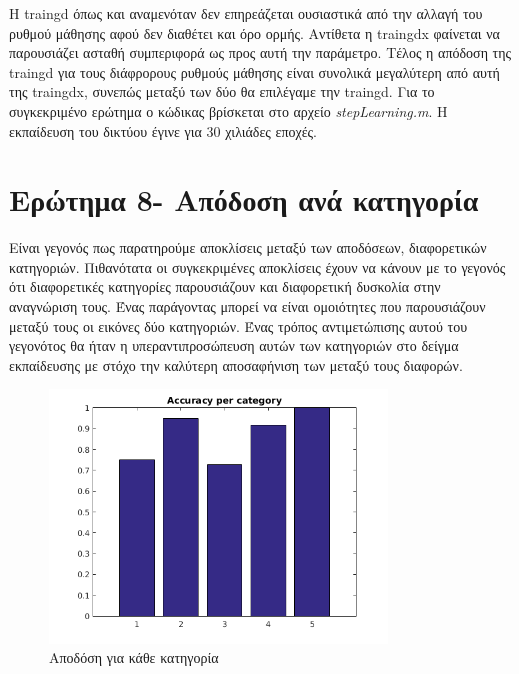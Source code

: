 \documentclass[12pt]{article}
\begin{document}
Η traingd όπως και αναμενόταν δεν επηρεάζεται ουσιαστικά από την αλλαγή του ρυθμού μάθησης αφού δεν διαθέτει και όρο ορμής. Αντίθετα η traingdx φαίνεται να παρουσιάζει ασταθή συμπεριφορά ως προς αυτή την παράμετρο. Τέλος η απόδοση της traingd για τους διάφρορους ρυθμούς μάθησης είναι συνολικά μεγαλύτερη από αυτή της traingdx, συνεπώς μεταξύ των δύο θα επιλέγαμε την traingd. Για το συγκεκριμένο ερώτημα ο κώδικας βρίσκεται στο αρχείο \textit{stepLearning.m}. Η εκπαίδευση του δικτύου έγινε για 30 χιλιάδες εποχές.

\section*{Ερώτημα 8- Απόδοση ανά κατηγορία }
Είναι γεγονός πως παρατηρούμε αποκλίσεις μεταξύ των αποδόσεων, διαφορετικών κατηγοριών. Πιθανότατα οι συγκεκριμένες αποκλίσεις έχουν να κάνουν με το γεγονός ότι διαφορετικές κατηγορίες παρουσιάζουν και διαφορετική δυσκολία στην αναγνώριση τους. Ένας παράγοντας μπορεί να είναι ομοιότητες που παρουσιάζουν μεταξύ τους οι εικόνες δύο κατηγοριών. Ένας τρόπος αντιμετώπισης αυτού του γεγονότος θα ήταν η υπεραντιπροσώπευση αυτών των κατηγοριών στο δείγμα εκπαίδευσης με στόχο την καλύτερη αποσαφήνιση των μεταξύ τους διαφορών. 

\begin{figure}[H]
	 		\centering
			\includegraphics[width=0.8\textwidth]{fakelos/acc_per_cat.png}
			\caption{Αποδόση για κάθε κατηγορία}
			\label{fig:8.acc-per-cat}
		\end{figure}	
		
		
\end{document}
